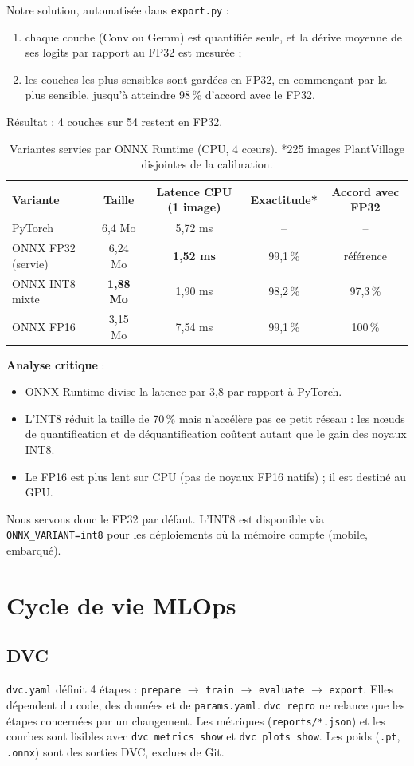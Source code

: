 \documentclass[11pt,a4paper]{article}
\begin{document}
Notre solution, automatisée dans \texttt{export.py} :
\begin{enumerate}
  \item chaque couche (Conv ou Gemm) est quantifiée seule, et la dérive moyenne de ses logits par rapport au FP32 est mesurée ;
  \item les couches les plus sensibles sont gardées en FP32, en commençant par la plus sensible, jusqu'à atteindre 98\,\% d'accord avec le FP32.
\end{enumerate}
Résultat : 4 couches sur 54 restent en FP32.
\begin{table}[H]\centering
\begin{tabular}{lcccc}\toprule
Variante & Taille & Latence CPU (1 image) & Exactitude* & Accord avec FP32\\\midrule
PyTorch & 6,4 Mo & 5,72 ms & -- & --\\
ONNX FP32 (servie) & 6,24 Mo & \textbf{1,52 ms} & 99,1\,\% & référence\\
ONNX INT8 mixte & \textbf{1,88 Mo} & 1,90 ms & 98,2\,\% & 97,3\,\%\\
ONNX FP16 & 3,15 Mo & 7,54 ms & 99,1\,\% & 100\,\%\\\bottomrule
\end{tabular}
\caption{Variantes servies par ONNX Runtime (CPU, 4 cœurs). *225 images PlantVillage disjointes de la calibration.}
\end{table}
\textbf{Analyse critique} :
\begin{itemize}
  \item ONNX Runtime divise la latence par 3,8 par rapport à PyTorch.
  \item L'INT8 réduit la taille de 70\,\% mais n'accélère pas ce petit réseau : les nœuds de quantification et de déquantification coûtent autant que le gain des noyaux INT8.
  \item Le FP16 est plus lent sur CPU (pas de noyaux FP16 natifs) ; il est destiné au GPU.
\end{itemize}
Nous servons donc le FP32 par défaut. L'INT8 est disponible via \texttt{ONNX\_VARIANT=int8} pour les déploiements où la mémoire compte (mobile, embarqué).

\section{Cycle de vie MLOps}
\subsection{DVC}
\texttt{dvc.yaml} définit 4 étapes : \texttt{prepare} $\rightarrow$ \texttt{train} $\rightarrow$ \texttt{evaluate} $\rightarrow$ \texttt{export}. Elles dépendent du code, des données et de \texttt{params.yaml}. \texttt{dvc repro} ne relance que les étapes concernées par un changement. Les métriques (\texttt{reports/*.json}) et les courbes sont lisibles avec \texttt{dvc metrics show} et \texttt{dvc plots show}. Les poids (\texttt{.pt}, \texttt{.onnx}) sont des sorties DVC, exclues de Git.
\end{document}
